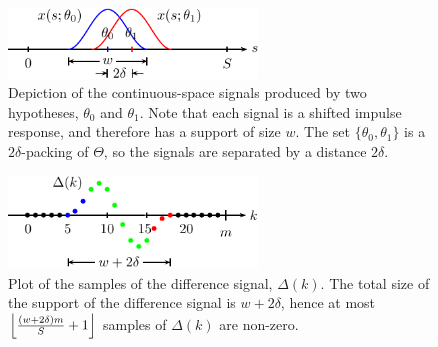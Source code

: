 \documentclass[conference]{IEEEtran}
\DeclarePairedDelimiter\floor{\lfloor}{\rfloor}
\begin{document}
\begin{figure}[t]
	\centering
	\includegraphics[width=2.6in]{overlap-middle-pics}
	\caption{Depiction of the continuous-space signals produced by two
		hypotheses, $\theta_0$ and $\theta_1$. Note that each signal is a
		shifted impulse response, and therefore has a support of size $w$.
		The set $\{\theta_0, \theta_1\}$ is a $2\delta$-packing of
		$\Theta$, so the signals are separated by a distance $2\delta$.}
	\label{fig:overlap-middle}
\end{figure}
\begin{figure}[t]
	\centering
	\includegraphics[width=2.6in]{delta-sampled-pics}
	\caption{Plot of the samples of the difference signal, $\Delta(k)$. The
		total size of the support of the difference signal is $w+2\delta$,
		hence at most $\floor*{\frac{(w + 2\delta)m}{S} + 1}$ samples of
		$\Delta(k)$ are non-zero.}
	\label{fig:delta-sampled}
\end{figure}
\end{document}
